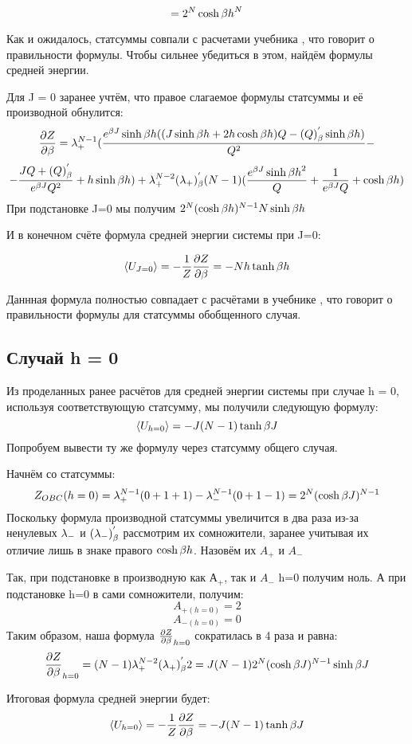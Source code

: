 \[= 2^{N}\cosh{\beta h}^{N}\]

Как и ожидалось, статсуммы совпали с расчетами учебника \cite{swendsen2020introduction}, что говорит о правильности формулы. Чтобы сильнее убедиться в этом, найдём формулы средней энергии. 

Для J = 0 заранее учтём, что правое слагаемое формулы статсуммы и её производной обнулится:
\[\frac{\partial Z}{\partial \beta} = \lambda_{+}^{N-1}(\frac{e^{\beta J}\sinh{\beta h}((J\sinh{\beta h} + 2h\cosh{\beta h})Q - (Q)^{'}_{\beta}\sinh{\beta h})}{Q^{2}} - \]
\[ - \frac{J Q + (Q)^{'}_{\beta}}{e^{\beta J} Q^{2}} + h\sinh{\beta h}) + \lambda_{+}^{N-2} (\lambda_{+})^{'}_{\beta}(N-1)(\frac{e^{\beta J} \sinh{\beta h}^2}{Q} + \frac{1}{e^{\beta J}Q} + \cosh{\beta h})\]
При подстановке J=0 мы получим $2^{N}(\cosh{\beta h})^{N-1}N\sinh{\beta h}$

И в конечном счёте формула средней энергии системы при J=0: 

\[\langle U_{J = 0} \rangle = - \frac{1}{Z} \frac{\partial Z}{\partial \beta} = - N h\tanh{\beta h}\]

Даннная формула полностью совпадает с расчётами в учебнике \cite{swendsen2020introduction}, что говорит о правильности формулы для статсуммы обобщенного случая.

\subsection{Случай h = 0}

Из проделанных ранее расчётов для средней энергии системы при случае h = 0, используя соответствующую статсумму, мы получили следующую формулу:
\[ \langle U_{h = 0} \rangle = - J(N - 1)\tanh{\beta J} \]
Попробуем вывести ту же формулу через статсумму общего случая.

Начнём со статсуммы:
\[ Z_{OBC}(h=0) = \lambda_{+}^{N-1}(0 + 1 + 1) - \lambda_{-}^{N-1}(0 + 1 - 1) = 2^{N}(\cosh{\beta J})^{N-1}\]
Поскольку формула производной статсуммы увеличится в два раза из-за ненулевых $\lambda_{-}$ и $(\lambda_{-})^{'}_{\beta}$ рассмотрим их сомножители, заранее учитывая их отличие лишь в знаке правого $\cosh{\beta h}$. Назовём их $A_{+}$ и $A_{-}$

Так, при подстановке в производную как $А_{+}$, так и $A_{-}$  h=0 получим ноль. А при подстановке h=0 в сами сомножители, получим:
\[A_{+(h=0)} = 2\]
\[A_{-(h=0)} = 0\]
Таким образом, наша формула $\frac{\partial Z}{\partial \beta}_{h=0}$ сократилась в 4 раза и равна:
\[ \frac{\partial Z}{\partial \beta}_{h=0} = (N-1)\lambda_{+}^{N-2}(\lambda_{+})^{'}_{\beta}2 = J(N-1)2^{N}(\cosh{\beta J})^{N-1}\sinh{\beta J}\]

Итоговая формула средней энергии будет:
\[ \langle U_{h=0} \rangle = - \frac{1}{Z} \frac{\partial Z}{\partial \beta} = - J (N - 1) \tanh{\beta J}\]

